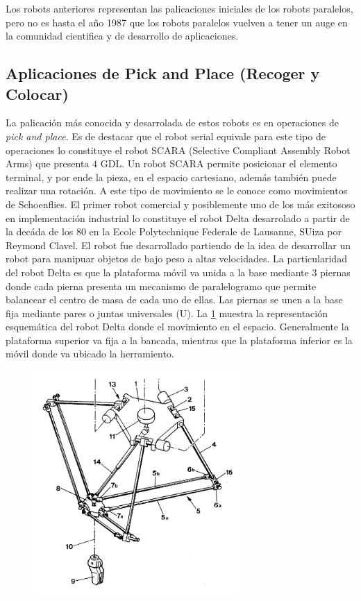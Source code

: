 \documentclass[letter,openrigh,12pt,spanish]{report}
\begin{document}
Los robots anteriores representan las palicaciones iniciales de los robots paralelos, pero no es hasta el a\~no 1987 que los robots paralelos vuelven a tener un auge en la comunidad cientifica y de desarrollo de aplicaciones.

\subsection{Aplicaciones de Pick and Place (Recoger y Colocar)}

La palicaci\'on m\'as conocida y desarrolada de estos robots es en operaciones de \textit{pick and place}. Es de destacar que el robot serial equivale para este tipo de operaciones lo constituye el robot SCARA (Selective Compliant Assembly Robot Arms) que presenta 4 GDL. Un robot SCARA permite posicionar el elemento terminal, y por ende la pieza, en el espacio cartesiano, adem\'as tambi\'en puede realizar una rotaci\'on. A este tipo de movimiento se le conoce como movimientos de Schoenflies. El primer robot comercial y posiblemente uno de los m\'as exitososo en implementaci\'on industrial lo constituye el robot Delta desarrolado a partir de la dec\'ada de los 80 en la Ecole Polytechnique Federale de Lausanne, SUiza por Reymond Clavel. El robot fue desarrollado partiendo de la idea de desarrollar un robot para manipuar objetos de bajo peso a altas velocidades. La particularidad del robot Delta es que la plataforma m\'ovil va unida a la base mediante 3 piernas donde cada pierna presenta un mecanismo de paralelogramo que permite balancear el centro de masa de cada uno de ellas. Las piernas se unen a la base fija mediante pares o juntas universales (U). La \ref{Figura 5} muestra la representaci\'on esquem\'atica del robot Delta donde el movimiento en el espacio. Generalmente la plataforma superior va fija a la bancada, mientras que la plataforma inferior es la m\'ovil donde va ubicado la herramiento.

\begin{figure}[htp]
\centering
\includegraphics[width=8cm]{fi4.png}
\caption{}
\label{Figura 5}
\end{figure}
\end{document}
